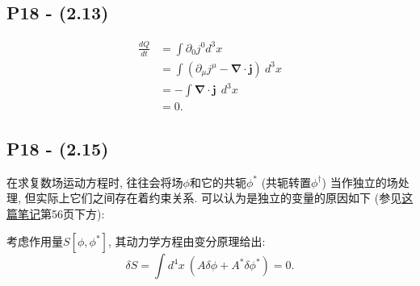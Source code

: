 
\subsection{P18 - (2.13)}
\begin{equation}
  \begin{aligned}
    \frac{dQ}{dt} & = \int \partial_0 j^0 d^3 x                                      \\
                  & = \int (\partial_\mu j^\mu - \bm{\nabla}\cdot\mathbf{j}) \ d^3 x \\
                  & = - \int \bm{\nabla}\cdot\mathbf{j}\ \ d^3 x                     \\
                  & =0.
  \end{aligned}
\end{equation}

\subsection{P18 - (2.15)}

在求复数场运动方程时, 往往会将场$\phi$和它的共轭$\phi^*$ (共轭转置$\phi^\dagger$) 当作独立的场处理, 但实际上它们之间存在着约束关系.
可以认为是独立的变量的原因如下 (参见\href{https://arxiv.org/abs/1110.5013v5}{这篇笔记}第56页下方):

考虑作用量$S[\phi,\phi^*]$, 其动力学方程由变分原理给出:
\begin{equation*}
  \delta S = \int d^4x\ (A\delta\phi + A^*\delta\phi^*) = 0.
\end{equation*}

